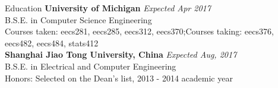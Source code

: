 \documentclass{resume} %
\begin{document}

\begin{rSection}{Education}
{\bf University of Michigan} \hfill {\em Expected Apr 2017} \\ 
B.S.E. in Computer Science Engineering\\
Courses taken: eecs281, eecs285, eecs312, eecs370;\quad Courses taking: eecs376, eecs482, eecs484, stats412\\
{\bf Shanghai Jiao Tong University, China} \hfill {\em Expected Aug, 2017} \\ 
B.S.E. in Electrical and Computer Engineering \\
Honors: Selected on the Dean's list, 2013 - 2014 academic year

\end{rSection}

%			
\end{document}
